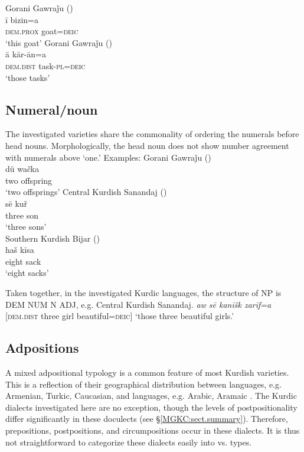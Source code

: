 \documentclass[output=paper,colorlinks,citecolor=brown]{langscibook}
\begin{document}
\begin{sloppypar}
\ea
\ea\label{MGKC:ex:4a}
Gorani Gawraǰu (\citealt[B, 0334]{mohammadirad_gorani_2022}) \\
\gll ī bizin=a \\
\textsc{dem.prox} goat=\textsc{deic} \\
\glt `this goat'
\ex\label{MGKC:ex:4b}
Gorani Gawraǰu (\citealt[170]{bailey_grammar_2018}) \\
\gll ā kār-ān=a \\
\textsc{dem.dist} task\textsc{-pl=deic} \\
\glt `those tasks' \\
\z
\z 

\subsection{Numeral/noun}
The investigated varieties share the commonality of ordering the numerals before head nouns. Morphologically, the head noun does not show number agreement with numerals above `one.' Examples:
\ea
\ea\label{MGKC:ex:5a}
Gorani Gawraǰu (\citealt[B, 0237]{mohammadirad_gorani_2022}) \\
\gll dü wačka \\
two offspring \\
\glt `two offsprings'
\ex\label{MGKC:ex:5b}
Central Kurdish Sanandaj (\citealt[A, 0001]{mohammadirad_Sanandaj_Kurdish_2022}) \\
\gll sē kuř \\
three son \\
\glt `three sons' \\
\ex\label{MGKC:ex:5c}
Southern Kurdish Bijar (\citealt[H, 1148]{mohammadirad_Bijar_Kurdish_2022}) \\
\gll haš kīsa \\
eight sack \\
\glt `eight sacks'
\z
\z 

Taken together, in the investigated Kurdic languages, the structure of NP is DEM NUM N ADJ, e.g. Central Kurdish Sanandaj. \textit{aw sē kanīšk zarīf=a} [\textsc{dem.dist} three girl beautiful=\textsc{deic}] `those three beautiful girls.'

\subsection{Adpositions}
A mixed adpositional typology is a common feature of most Kurdish varieties. This is a reflection of their geographical distribution between  languages, e.g. Armenian, Turkic, Caucasian, and  languages, e.g. Arabic, Aramaic \citep[cf.][6--7]{stilo_circumpositions_2009}{}. The Kurdic dialects investigated here are no exception, though the levels of postpositionality differ significantly in these doculects (see \S\ref{MGKC:sect.summary}). Therefore, prepositions, postpositions, and circumpositions occur in these dialects. It is thus not straightforward to categorize these dialects easily into  vs.  types.


\end{sloppypar}
\end{document}
